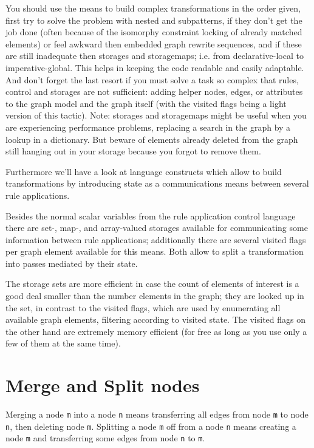 \begin{note}
You should use the means to build complex transformations in the order given, first try to solve the problem with nested and subpatterns, if they don't get the job done (often because of the isomorphy constraint locking of already matched elements) or feel awkward then embedded graph rewrite sequences, and if these are still inadequate then storages and storagemaps; i.e. from declarative-local to imperative-global. This helps in keeping the code readable and easily adaptable. And don't forget the last resort if you must solve a task so complex that rules, control and storages are not sufficient: adding helper nodes, edges, or attributes to the graph model and the graph itself (with the visited flags being a light version of this tactic). Note: storages and storagemaps might be useful when you are experiencing performance problems, replacing a search in the graph by a lookup in a dictionary. But beware of elements already deleted from the graph still hanging out in your storage because you forgot to remove them.
\end{note}

Furthermore we'll have a look at language constructs which allow to build transformations by introducing state as a communications means between several rule applications.

Besides the normal scalar variables from the rule application control language there are set-, map-, and array-valued storages available for communicating some information between rule applications;
additionally there are several visited flags per graph element available for this means.
Both allow to split a transformation into passes mediated by their state.

\begin{note}
The storage sets are more efficient in case the count of elements of interest is a good deal smaller than the number elements in the graph; they are looked up in the set, in contrast to the visited flags, which are used by enumerating all available graph elements, filtering according to visited state.
The visited flags on the other hand are extremely memory efficient (for free as long as you use only a few of them at the same time).
\end{note}


\section{Merge and Split nodes}
Merging a node \texttt{m} into a node \texttt{n} means transferring all edges from node \texttt{m} to node \texttt{n}, then deleting node \texttt{m}.
Splitting a node \texttt{m} off from a node \texttt{n} means creating a node \texttt{m} and transferring some edges from node \texttt{n} to \texttt{m}.

